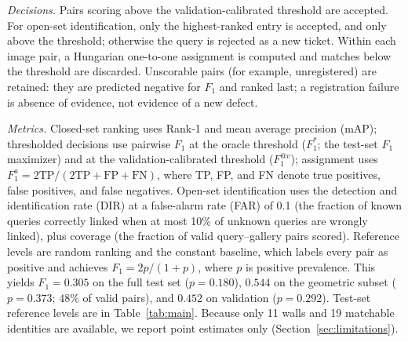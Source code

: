 \textit{Decisions.} Pairs scoring above the validation-calibrated threshold are accepted. For open-set identification, only the highest-ranked entry is accepted, and only above the threshold; otherwise the query is rejected as a new ticket. Within each image pair, a Hungarian one-to-one assignment is computed and matches below the threshold are discarded. Unscorable pairs (for example, unregistered) are retained: they are predicted negative for $F_1$ and ranked last; a registration failure is absence of evidence, not evidence of a new defect.

\textit{Metrics.} Closed-set ranking uses Rank-1 and mean average precision (mAP); thresholded decisions use pairwise $F_1$ at the oracle threshold ($F_1^{*}$; the test-set $F_1$ maximizer) and at the validation-calibrated threshold ($F_1^{@v}$); assignment uses $F_1^{a} = 2\text{TP}/(2\text{TP}+\text{FP}+\text{FN})$, where TP, FP, and FN denote true positives, false positives, and false negatives. Open-set identification uses the detection and identification rate (DIR) at a false-alarm rate (FAR) of 0.1 (the fraction of known queries correctly linked when at most 10\% of unknown queries are wrongly linked), plus coverage (the fraction of valid query--gallery pairs scored).
Reference levels are random ranking and the constant baseline, which labels every pair as positive and achieves $F_1 = 2p/(1+p)$, where $p$ is positive prevalence. This yields $F_1 = 0.305$ on the full test set ($p = 0.180$), $0.544$ on the geometric subset ($p = 0.373$; $48\%$ of valid pairs), and $0.452$ on validation ($p = 0.292$). Test-set reference levels are in Table~\ref{tab:main}.
Because only 11 walls and 19 matchable identities are available, we report point estimates only (Section~\ref{sec:limitations}).
